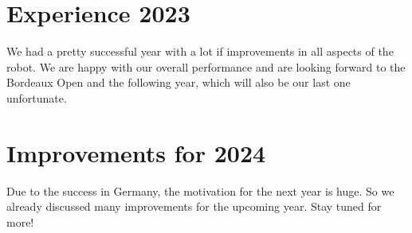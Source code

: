 \section{Experience 2023}
We had a pretty successful year with a lot if improvements in all aspects of the robot.
We are happy with our overall performance and are looking forward to the Bordeaux Open and the following year, 
which will also be our last one unfortunate.
 
\section{Improvements for 2024}
Due to the success in Germany, the motivation for the next year is huge. So we already discussed
many improvements for the upcoming year. 
\newline
Stay tuned for more!